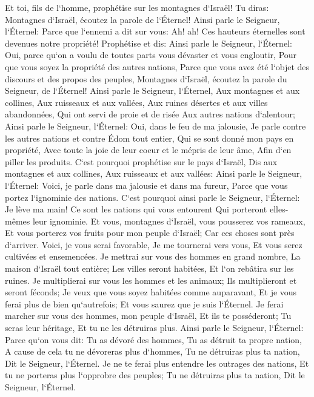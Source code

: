 \verse Et toi, fils de l`homme, prophétise sur les montagnes d`Israël! Tu diras: Montagnes d`Israël, écoutez la parole de l`Éternel! 
\verse Ainsi parle le Seigneur, l`Éternel: Parce que l`ennemi a dit sur vous: Ah! ah! Ces hauteurs éternelles sont devenues notre propriété! 
\verse Prophétise et dis: Ainsi parle le Seigneur, l`Éternel: Oui, parce qu`on a voulu de toutes parts vous dévaster et vous engloutir, Pour que vous soyez la propriété des autres nations, Parce que vous avez été l`objet des discours et des propos des peuples, 
\verse Montagnes d`Israël, écoutez la parole du Seigneur, de l`Éternel! Ainsi parle le Seigneur, l`Éternel, Aux montagnes et aux collines, Aux ruisseaux et aux vallées, Aux ruines désertes et aux villes abandonnées, Qui ont servi de proie et de risée Aux autres nations d`alentour; 
\verse Ainsi parle le Seigneur, l`Éternel: Oui, dans le feu de ma jalousie, Je parle contre les autres nations et contre Édom tout entier, Qui se sont donné mon pays en propriété, Avec toute la joie de leur coeur et le mépris de leur âme, Afin d`en piller les produits. 
\verse C`est pourquoi prophétise sur le pays d`Israël, Dis aux montagnes et aux collines, Aux ruisseaux et aux vallées: Ainsi parle le Seigneur, l`Éternel: Voici, je parle dans ma jalousie et dans ma fureur, Parce que vous portez l`ignominie des nations. 
\verse C`est pourquoi ainsi parle le Seigneur, l`Éternel: Je lève ma main! Ce sont les nations qui vous entourent Qui porteront elles-mêmes leur ignominie. 
\verse Et vous, montagnes d`Israël, vous pousserez vos rameaux, Et vous porterez vos fruits pour mon peuple d`Israël; Car ces choses sont près d`arriver. 
\verse Voici, je vous serai favorable, Je me tournerai vers vous, Et vous serez cultivées et ensemencées. 
\verse Je mettrai sur vous des hommes en grand nombre, La maison d`Israël tout entière; Les villes seront habitées, Et l`on rebâtira sur les ruines. 
\verse Je multiplierai sur vous les hommes et les animaux; Ils multiplieront et seront féconds; Je veux que vous soyez habitées comme auparavant, Et je vous ferai plus de bien qu`autrefois; Et vous saurez que je suis l`Éternel. 
\verse Je ferai marcher sur vous des hommes, mon peuple d`Israël, Et ils te posséderont; Tu seras leur héritage, Et tu ne les détruiras plus. 
\verse Ainsi parle le Seigneur, l`Éternel: Parce qu`on vous dit: Tu as dévoré des hommes, Tu as détruit ta propre nation, 
\verse A cause de cela tu ne dévoreras plus d`hommes, Tu ne détruiras plus ta nation, Dit le Seigneur, l`Éternel. 
\verse Je ne te ferai plus entendre les outrages des nations, Et tu ne porteras plus l`opprobre des peuples; Tu ne détruiras plus ta nation, Dit le Seigneur, l`Éternel. 
